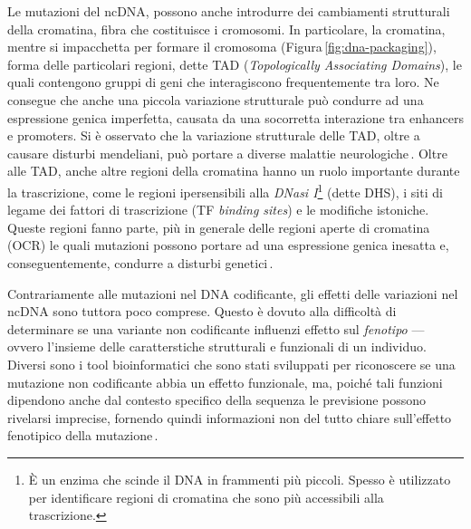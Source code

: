 Le mutazioni del \acs{ncDNA}, possono anche introdurre dei cambiamenti strutturali della cromatina, fibra che costituisce i cromosomi. In particolare, la cromatina, mentre si impacchetta per formare il cromosoma (Figura\,\ref{fig:dna-packaging}), forma delle particolari regioni, dette \acs{TAD} (\textit{Topologically Associating Domains}), le quali contengono gruppi di geni che interagiscono frequentemente tra loro. Ne consegue che anche una piccola variazione strutturale può condurre ad una espressione genica imperfetta, causata da una socorretta interazione tra enhancers e promoters. Si è osservato che la variazione strutturale delle \acs{TAD}, oltre a causare disturbi mendeliani, può portare a diverse malattie neurologiche\,\cite{french2020role, kaiser2017tads}. Oltre alle \acs{TAD}, anche altre regioni della cromatina hanno un ruolo importante durante la trascrizione, come le regioni ipersensibili alla \textsl{DNasi I}\footnote{È un enzima che scinde il \acs{DNA} in frammenti più piccoli. Spesso è utilizzato per identificare regioni di cromatina che sono più accessibili alla trascrizione.} (dette \acs{DHS}), i siti di legame dei fattori di trascrizione (\acs{TF} \textit{binding sites}) e le modifiche istoniche. Queste regioni fanno parte, più in generale delle regioni aperte di cromatina (\acs{OCR}) le quali mutazioni possono portare ad una espressione genica inesatta e, conseguentemente, condurre a disturbi genetici\,\cite{zhou2015predicting, ma2023deepsata}.

Contrariamente alle mutazioni nel \acs{DNA} codificante, gli effetti delle variazioni nel \acs{ncDNA} sono tuttora poco comprese. Questo è dovuto alla difficoltà di determinare se una variante non codificante influenzi effetto sul \textsl{fenotipo} — ovvero l'insieme delle caratterstiche strutturali e funzionali di un individuo. Diversi sono i tool bioinformatici che sono stati sviluppati per riconoscere se una mutazione non codificante abbia un effetto funzionale, ma, poiché tali funzioni dipendono anche dal contesto specifico della sequenza le previsione possono rivelarsi imprecise, fornendo quindi informazioni non del tutto chiare sull'effetto fenotipico della mutazione\,\cite{schipper2022demystifying, pena2024decoding}. 
